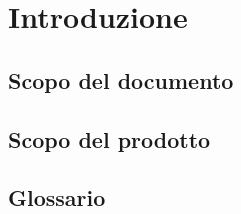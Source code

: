 \section{Introduzione}

\subsection{Scopo del documento}

\subsection{Scopo del prodotto}
 
\subsection{Glossario}




